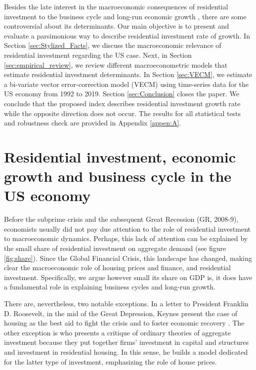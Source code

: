 \documentclass[12pt, a4paper]{article}
\begin{document}
Besides the late interest in the macroeconomic consequences of residential investment to the business cycle and long-run economic growth \cite{fiebiger_trend_2017,fiebiger_semi-autonomous_2018,perez_Montiel_2021}, there are some controversial about its determinants.
Our main objective is to present and evaluate a parsimonious way to describe residential investment rate of growth.
In Section \ref{sec:Stylized_Facts}, we discuss the macroeconomic relevance of residential investment regarding the US case.
Next, in Section \ref{sec:empirical_review}, we review different macroeconometric models that estimate residential investment determinants.
In Section \ref{sec:VECM}, we estimate a bi-variate vector error-correction model (VECM) using time-series data for the US economy from 1992 to 2019.
Section \ref{sec:Conclusion} closes the paper.
We conclude that the proposed index describes residential investment growth rate while the opposite direction does not occur.
The results for all statistical tests and robustness check are provided in Appendix \ref{appen:A}.



\section{Residential investment, economic growth and business cycle in the US economy}
\label{sec:org3a29557}
\label{sec:Stylized_Facts}
Before the subprime crisis and the subsequent Great Recession (GR, 2008-9), economists usually did not pay due attention to the role of residential investment to macroeconomic dynamics.
Perhaps, this lack of attention can be explained by the small share of residential investment on aggregate demand (see figure \ref{fig:share}).
Since the Global Financial Crisis, this landscape has changed, making clear the macroeconomic role of housing prices and finance, and residential investment.
Specifically, we argue however small its share on GDP is, it does have a fundamental role in explaining business cycles and long-run growth.

There are, nevertheless, two notable exceptions. In a letter to President Franklin D. Roosevelt, in the mid of the Great Depression, Keynes present the case of housing as the best aid to fight the crisis and to foster economic recovery \cite[p.~436]{keynes_collected_1978}.
The other exception is \textcite{duesenberry_investment_1958} who presents a critique of ordinary theories of aggregate investment because they put together firms’ investment in capital and structures and investment in residential housing.
In this sense, he builds a model dedicated for the latter type of investment, emphasizing the role of house prices.
\end{document}
